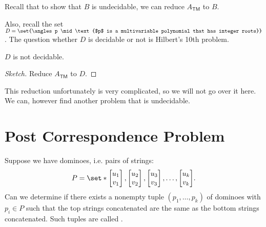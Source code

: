 \documentclass{standalone}
\begin{document}
Recall that to show that \(B\) is undecidable, we can reduce \(A_{\textsf{TM}}\) to \(B\).

Also, recall the set \(D = \set{\angles p \mid \text{$p$ is a multivariable polynomial that has integer roots}}\). The question whether \(D\) is decidable or not is Hilbert's 10th problem.

\begin{proposition}[1971]
	\(D\) is not decidable.
\end{proposition}
\begin{proof}[Sketch]
	Reduce \(A_{\textsf{TM}}\) to \(D\).
\end{proof}
This reduction unfortunately is very complicated, so we will not go over it here. We can, however find another problem that is undecidable.

\section{Post Correspondence Problem}
Suppose we have dominoes, i.e. pairs of strings:
\[
	P = \set*{
		\begin{bmatrix} u_1 \\ v_1 \end{bmatrix},
		\begin{bmatrix} u_2 \\ v_2 \end{bmatrix},
		\begin{bmatrix} u_3 \\ v_3 \end{bmatrix}, \dots,
		\begin{bmatrix} u_k \\ v_k \end{bmatrix}
	}.
\]
Can we determine if there exists a nonempty tuple \((p_1, \dots, p_k)\) of dominoes with \(p_i \in P\) such that the top strings concatenated are the same as the bottom strings concatenated. Such tuples are called .
\end{document}
